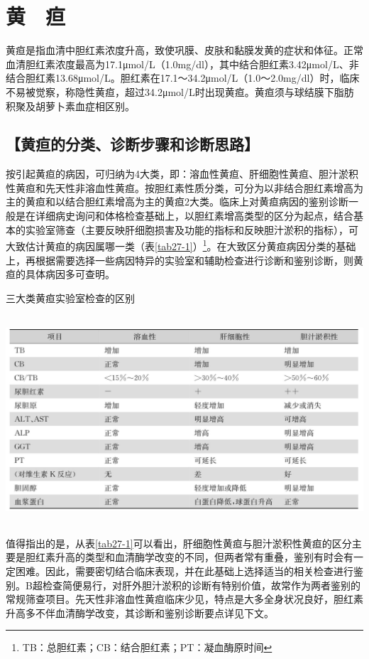 \chapter{黄　疸}

黄疸是指血清中胆红素浓度升高，致使巩膜、皮肤和黏膜发黄的症状和体征。正常血清胆红素浓度最高为17.1μmol/L（1.0mg/dl），其中结合胆红素3.42μmol/L、非结合胆红素13.68μmol/L。胆红素在17.1～34.2μmol/L（1.0～2.0mg/dl）时，临床不易被觉察，称隐性黄疸，超过34.2μmol/L时出现黄疸。黄疸须与球结膜下脂肪积聚及胡萝卜素血症相区别。

\section{【黄疸的分类、诊断步骤和诊断思路】}

按引起黄疸的病因，可归纳为4大类，即：溶血性黄疸、肝细胞性黄疸、胆汁淤积性黄疸和先天性非溶血性黄疸。按胆红素性质分类，可分为以非结合胆红素增高为主的黄疸和以结合胆红素增高为主的黄疸2大类。临床上对黄疸病因的鉴别诊断一般是在详细病史询问和体格检查基础上，以胆红素增高类型的区分为起点，结合基本的实验室筛查（主要反映肝细胞损害及功能的指标和反映胆汁淤积的指标），可大致估计黄疸的病因属哪一类（表\ref{tab27-1}）\footnote{TB：总胆红素；CB：结合胆红素；PT：凝血酶原时间}。在大致区分黄疸病因分类的基础上，再根据需要选择一些病因特异的实验室和辅助检查进行诊断和鉴别诊断，则黄疸的具体病因多可查明。

\begin{table}[htbp]
\centering
\caption{三大类黄疸实验室检查的区别}
\label{tab27-1}
\includegraphics[width=5.96875in,height=3.05208in]{./images/Image00150.jpg}
\end{table}


值得指出的是，从表\ref{tab27-1}可以看出，肝细胞性黄疸与胆汁淤积性黄疸的区分主要是胆红素升高的类型和血清酶学改变的不同，但两者常有重叠，鉴别有时会有一定困难。因此，需要密切结合临床表现，并在此基础上选择适当的相关检查进行鉴别。B超检查简便易行，对肝外胆汁淤积的诊断有特别价值，故常作为两者鉴别的常规筛查项目。先天性非溶血性黄疸临床少见，特点是大多全身状况良好，胆红素升高多不伴血清酶学改变，其诊断和鉴别诊断要点详见下文。

